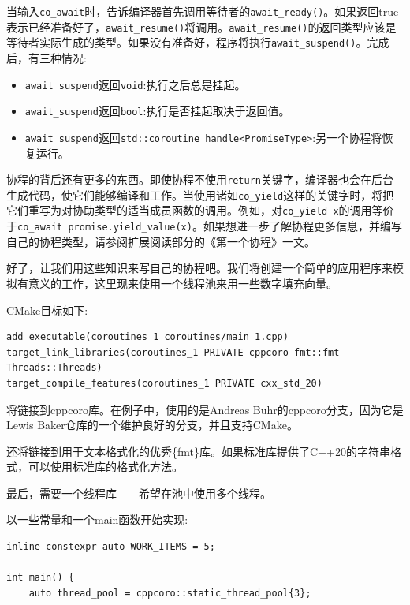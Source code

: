 当输入\texttt{co\_await}时，告诉编译器首先调用等待者的\texttt{await\_ready()}。如果返回true表示已经准备好了，\texttt{await\_resume()}将调用。\texttt{await\_resume()}的返回类型应该是等待者实际生成的类型。如果没有准备好，程序将执行\texttt{await\_suspend()}。完成后，有三种情况:

\begin{itemize}
\item 
\texttt{await\_suspend}返回\texttt{void}:执行之后总是挂起。

\item 
\texttt{await\_suspend}返回\texttt{bool}:执行是否挂起取决于返回值。

\item 
\texttt{await\_suspend}返回\texttt{std::coroutine\_handle<PromiseType>}:另一个协程将恢复运行。
\end{itemize}

协程的背后还有更多的东西。即使协程不使用\texttt{return}关键字，编译器也会在后台生成代码，使它们能够编译和工作。当使用诸如\texttt{co\_yield}这样的关键字时，将把它们重写为对协助类型的适当成员函数的调用。例如，对\texttt{co\_yield x}的调用等价于\texttt{co\_await promise.yield\_value(x)}。如果想进一步了解协程更多信息，并编写自己的协程类型，请参阅扩展阅读部分的《第一个协程》一文。

好了，让我们用这些知识来写自己的协程吧。我们将创建一个简单的应用程序来模拟有意义的工作，这里现来使用一个线程池来用一些数字填充向量。

CMake目标如下:

\begin{lstlisting}[style=styleCMake]
add_executable(coroutines_1 coroutines/main_1.cpp)
target_link_libraries(coroutines_1 PRIVATE cppcoro fmt::fmt
Threads::Threads)
target_compile_features(coroutines_1 PRIVATE cxx_std_20)
\end{lstlisting}

将链接到cppcoro库。在例子中，使用的是Andreas Buhr的cppcoro分支，因为它是Lewis Baker仓库的一个维护良好的分支，并且支持CMake。

还将链接到用于文本格式化的优秀\{fmt\}库。如果标准库提供了C++20的字符串格式，可以使用标准库的格式化方法。

最后，需要一个线程库——希望在池中使用多个线程。

以一些常量和一个main函数开始实现:

\begin{lstlisting}[style=styleCXX]
inline constexpr auto WORK_ITEMS = 5;

int main() {
	auto thread_pool = cppcoro::static_thread_pool{3};
\end{lstlisting}

